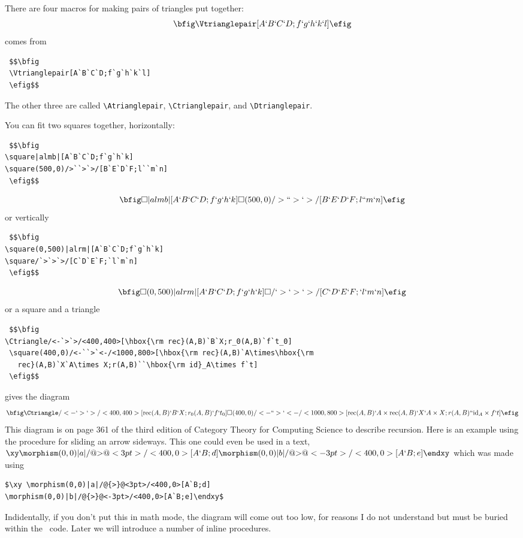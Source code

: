 \documentclass[12pt]{article}
\begin{document}
{There are four macros for making pairs of triangles put together:
 $$\bfig
 \Vtrianglepair[A`B`C`D;f`g`h`k`l]
 \efig$$
 comes from
\begin{verbatim}
 $$\bfig
 \Vtrianglepair[A`B`C`D;f`g`h`k`l]
 \efig$$
\end{verbatim}

 The other three are called \verb.\Atrianglepair.,
\verb.\Ctrianglepair., and \verb.\Dtrianglepair..

 You can fit two squares together, horizontally:
\begin{verbatim}
 $$\bfig
\square|almb|[A`B`C`D;f`g`h`k]
\square(500,0)/>``>`>/[B`E`D`F;l``m`n]
 \efig$$
\end{verbatim}
 $$\bfig
\square|almb|[A`B`C`D;f`g`h`k]
\square(500,0)/>``>`>/[B`E`D`F;l``m`n]
 \efig$$
 or vertically
\begin{verbatim}
 $$\bfig
\square(0,500)|alrm|[A`B`C`D;f`g`h`k]
\square/`>`>`>/[C`D`E`F;`l`m`n]
 \efig$$
\end{verbatim}
 $$\bfig
\square(0,500)|alrm|[A`B`C`D;f`g`h`k]
\square/`>`>`>/[C`D`E`F;`l`m`n]
 \efig$$
or a square and a triangle
\begin{verbatim}
 $$\bfig
\Ctriangle/<-`>`>/<400,400>[\hbox{\rm rec}(A,B)`B`X;r_0(A,B)`f`t_0]
 \square(400,0)/<-``>`<-/<1000,800>[\hbox{\rm rec}(A,B)`A\times\hbox{\rm
   rec}(A,B)`X`A\times X;r(A,B)``\hbox{\rm id}_A\times f`t]
 \efig$$
\end{verbatim}
 gives the diagram
 $$\bfig
\Ctriangle/<-`>`>/<400,400>[\hbox{\rm rec}(A,B)`B`X;r_0(A,B)`f`t_0]
 \square(400,0)/<-``>`<-/<1000,800>[\hbox{\rm rec}(A,B)`A\times\hbox{\rm
   rec}(A,B)`X`A\times X;r(A,B)``\hbox{\rm id}_A\times f`t]
 \efig$$
 This diagram is on page 361 of the third edition of Category Theory for
Computing Science to describe recursion.
 Here is an example using the procedure for sliding an arrow sideways.
This one could even be used in a text,
$\xy \morphism(0,0)|a|/@{>}@<3pt>/<400,0>[A`B;d]
\morphism(0,0)|b|/@{>}@<-3pt>/<400,0>[A`B;e]\endxy$
 which was made using
\begin{verbatim}
$\xy \morphism(0,0)|a|/@{>}@<3pt>/<400,0>[A`B;d]
\morphism(0,0)|b|/@{>}@<-3pt>/<400,0>[A`B;e]\endxy$
\end{verbatim}
 Indidentally, if you don't put this in math mode, the diagram will come
out too low, for reasons I do not understand but must be buried within
the \xypic\ code.
Later we will introduce a number of inline procedures.

}
\end{document}
